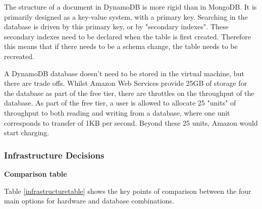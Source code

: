 \documentclass[12pt]{article}
\begin{document}
The structure of a document in DynamoDB is more rigid than in MongoDB. It is primarily designed as a key-value system, with a primary key. Searching in the database is driven by this primary key, or by "secondary indexes". These secondary indexes need to be declared when the table is first created. Therefore this means that if there needs to be a schema change, the table needs to be recreated.

A DynamoDB database doesn't need to be stored in the virtual machine, but there are trade offs. Whilst Amazon Web Services provide 25GB of storage for the database as part of the free tier, there are throttles on the throughput of the database. As part of the free tier, a user is allowed to allocate 25 "units" of throughput to both reading and writing from a database, where one unit corresponds to transfer of 1KB per second. Beyond these 25 units, Amazon would start charging.

\subsubsection{Infrastructure Decisions}

\textbf{Comparison table}

Table \ref{infrastructuretable} shows the key points of comparison between the four main options for hardware and database combinations. \\
\end{document}
